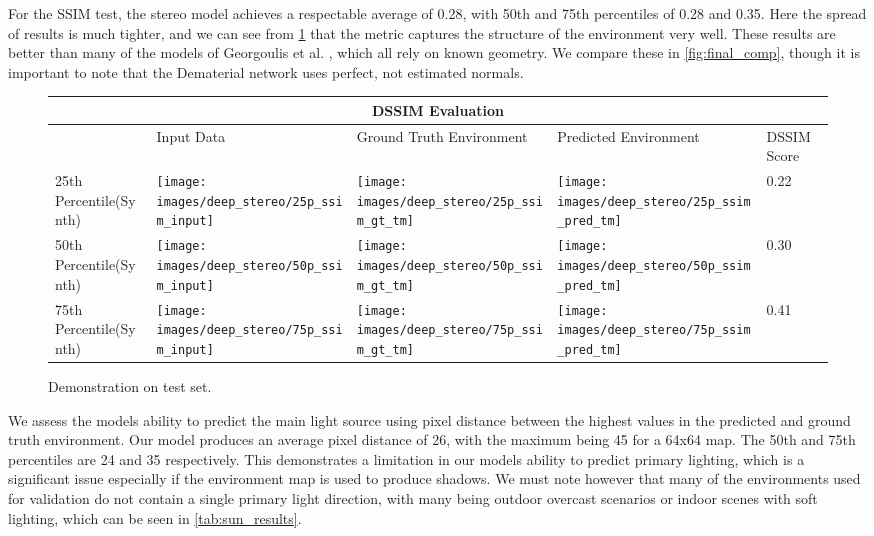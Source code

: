 \documentclass[ %
                    author={Gavin Parker},
                supervisor={Dr. Neill Campbell},
                    degree={MEng},
                     title={Deep Learning for Illumination Estimation from Stereo Images},
                  subtitle={},
                      type={Research},
                      year={2018} ]{dissertation}
\begin{document}
For the SSIM test, the stereo model achieves a respectable average of 0.28, with 50th and 75th percentiles of 0.28 and 0.35. Here the spread of results is much tighter, and we can see from \ref{tab:ssim_results} that the metric captures the structure of the environment very well. These results are better than many of the models of Georgoulis et al. \cite{Georgoulis_2017_ICCV}, which all rely on known geometry. We compare these in \ref{fig:final_comp}, though it is important to note that the Dematerial network uses perfect, not estimated normals.
 \newline
 \begin{figure}[H]
\centering
\begin{tabular}{ |p{3cm}||p{3cm}|p{3cm}|p{3cm}|p{3cm}|  }
 \hline
 \multicolumn{5}{|c|}{DSSIM Evaluation} \\
 \hline
  & Input Data &Ground Truth Environment&Predicted Environment&DSSIM Score\\
 \hline
 25th Percentile(Synth)&\parbox[c]{1em}{
 \texttt{[image: images/deep\_stereo/25p\_ssim\_input]}}&\parbox[c]{1em}{\texttt{[image: images/deep\_stereo/25p\_ssim\_gt\_tm]}}&
\parbox[c]{1em}{\texttt{[image: images/deep\_stereo/25p\_ssim\_pred\_tm]}}& 0.22\\
 50th Percentile(Synth)&\parbox[c]{1em}{
 \texttt{[image: images/deep\_stereo/50p\_ssim\_input]}}&\parbox[c]{1em}{\texttt{[image: images/deep\_stereo/50p\_ssim\_gt\_tm]}}&
\parbox[c]{1em}{\texttt{[image: images/deep\_stereo/50p\_ssim\_pred\_tm]}}& 0.30\\
 75th Percentile(Synth)&\parbox[c]{1em}{
 \texttt{[image: images/deep\_stereo/75p\_ssim\_input]}}&\parbox[c]{1em}{\texttt{[image: images/deep\_stereo/75p\_ssim\_gt\_tm]}}&
\parbox[c]{1em}{\texttt{[image: images/deep\_stereo/75p\_ssim\_pred\_tm]}}& 0.41\\

 \hline
\end{tabular}

\caption{Demonstration on test set.}
\label{tab:ssim_results}

\end{figure}
 We assess the models ability to predict the main light source using pixel distance between the highest values in the predicted and ground truth environment. Our model produces an average pixel distance of 26, with the maximum being 45 for a 64x64 map. The 50th and 75th percentiles are 24 and 35 respectively. This demonstrates a limitation in our models ability to predict primary lighting, which is a significant issue especially if the environment map is used to produce shadows. We must note however that many of the environments used for validation do not contain a single primary light direction, with many being outdoor overcast scenarios or indoor scenes with soft lighting, which can be seen in \ref{tab:sun_results}.
\end{document}

